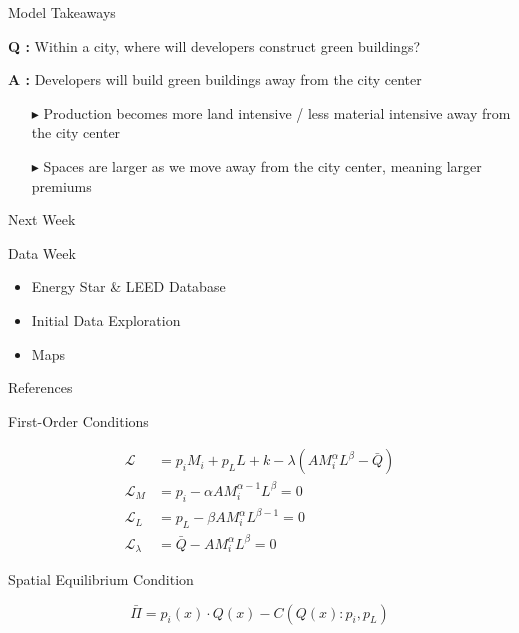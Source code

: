 \documentclass[11pt]{beamer}
\begin{document}
\begin{frame}{Model Takeaways}

\textbf{\textcolor{EAPgreen}{Q :}} Within a city, where will developers construct green buildings?

\vfill
\textbf{\textcolor{EAPgreen}{A :}} Developers will build green buildings away from the city center
\begin{itemize}
	\item[\textcolor{EAPyellow}{$\blacktriangleright$}] Production becomes more land intensive / less material intensive away from the city center
	\item[\textcolor{EAPyellow}{$\blacktriangleright$}] Spaces are larger as we move away from the city center, meaning larger premiums
\end{itemize}


\end{frame}


\begin{frame}{Next Week}

Data Week
\begin{itemize}
	\item Energy Star \& LEED Database
	\item Initial Data Exploration
	\item Maps
\end{itemize}

\end{frame}


\begin{frame}{References}


\end{frame}



\begin{frame}{First-Order Conditions}

\begin{align*}
	\mathscr{L} &= p_i M_i + p_L L + k - \lambda( AM_i^\alpha L^\beta - \bar{Q})\\
	\mathscr{L}_M &= p_i - \alpha AM_i^{\alpha - 1} L^\beta = 0\\
	\mathscr{L}_L &= p_L - \beta AM_i^\alpha L^{\beta -1} = 0\\
	\mathscr{L}_\lambda &= \bar{Q} - AM_i^\alpha L^\beta = 0
\end{align*}

\end{frame}


\begin{frame}{Spatial Equilibrium Condition}

$$ \bar{\Pi} = p_i(x) \cdot Q(x) - C( Q(x) : p_i, p_L) $$

\end{frame}
\end{document}
